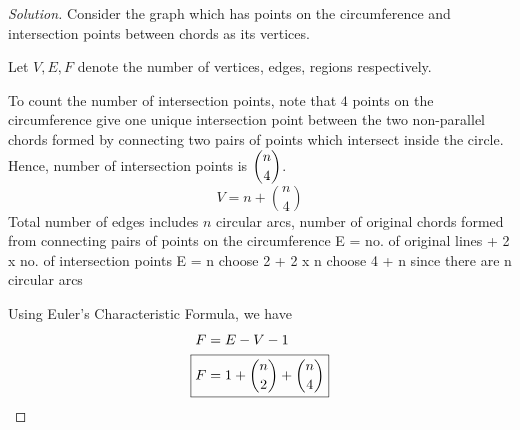 \begin{proof}[Solution]
Consider the graph which has points on the circumference and intersection points between chords as its vertices.

Let $V, E, F$ denote the number of vertices, edges, regions respectively.

To count the number of intersection points, note that $4$ points on the circumference give one unique intersection point between the two non-parallel chords formed by connecting two pairs of points which intersect inside the circle. Hence, number of intersection points is $\dbinom{n}{4}$. 
\[ V = n + \binom{n}{4} \]
Total number of edges includes $n$ circular arcs, number of original chords formed from connecting pairs of points on the circumference
E = no. of original lines + 2 x no. of intersection points
E = n choose 2 + 2 x n choose 4 + n
since there are n circular arcs

Using Euler's Characteristic Formula, we have 
\begin{align*}
F &= E - V - 1 \\
\Aboxed{F &= 1 + \binom{n}{2} + \binom{n}{4}}
\end{align*}
\end{proof}

